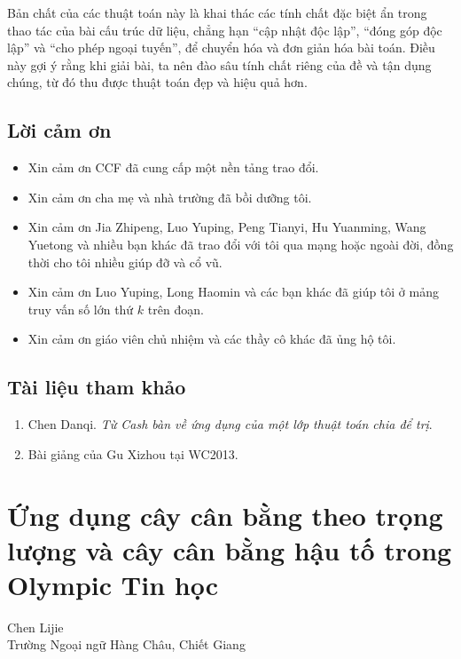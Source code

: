 \documentclass[11pt]{article}
\begin{document}
Bản chất của các thuật toán này là khai thác các tính chất đặc biệt ẩn trong
thao tác của bài cấu trúc dữ liệu, chẳng hạn ``cập nhật độc lập'', ``đóng
góp độc lập'' và ``cho phép ngoại tuyến'', để chuyển hóa và đơn giản hóa bài
toán. Điều này gợi ý rằng khi giải bài, ta nên đào sâu tính chất riêng của
đề và tận dụng chúng, từ đó thu được thuật toán đẹp và hiệu quả hơn.

\subsection{Lời cảm ơn}

\begin{itemize}
  \item Xin cảm ơn CCF đã cung cấp một nền tảng trao đổi.
  \item Xin cảm ơn cha mẹ và nhà trường đã bồi dưỡng tôi.
  \item Xin cảm ơn Jia Zhipeng, Luo Yuping, Peng Tianyi, Hu Yuanming, Wang
  Yuetong và nhiều bạn khác đã trao đổi với tôi qua mạng hoặc ngoài đời,
  đồng thời cho tôi nhiều giúp đỡ và cổ vũ.
  \item Xin cảm ơn Luo Yuping, Long Haomin và các bạn khác đã giúp tôi ở
  mảng truy vấn số lớn thứ \(k\) trên đoạn.
  \item Xin cảm ơn giáo viên chủ nhiệm và các thầy cô khác đã ủng hộ tôi.
\end{itemize}

\subsection{Tài liệu tham khảo}

\begin{enumerate}
  \item Chen Danqi. \emph{Từ \emph{Cash} bàn về ứng dụng của một lớp thuật
  toán chia để trị}.
  \item Bài giảng của Gu Xizhou tại WC2013.
\end{enumerate}

\section{Ứng dụng cây cân bằng theo trọng lượng và cây cân bằng hậu tố trong
Olympic Tin học}

\begin{center}
Chen Lijie\\
Trường Ngoại ngữ Hàng Châu, Chiết Giang
\end{center}
\end{document}
